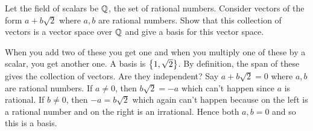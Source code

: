 \begin{ex}
  Let the field of scalars be $\mathbb{Q}$, the set of rational
  numbers. Consider vectors of the form $a+b\sqrt{2}$ where $a,b$ are
  rational numbers. Show that this collection of vectors is a vector
  space over $\mathbb{Q}$ and give a basis for this vector space.
  \begin{sol}
    When you add two of these you get one and when you multiply one of
    these by a scalar, you get another one. A basis is
    $\left\{1,\sqrt{2}\right\}$. By definition, the span of these gives the
    collection of vectors. Are they independent? Say $a+b\sqrt{2}=0$
    where $a,b$ are rational numbers. If $a\neq 0$, then
    $b\sqrt{2}=-a$ which can't happen since $a$ is rational. If
    $b\neq 0$, then $-a=b\sqrt{2}$ which again can't happen because on
    the left is a rational number and on the right is an
    irrational. Hence both $a,b=0$ and so this is a basis.
  \end{sol}
\end{ex}

